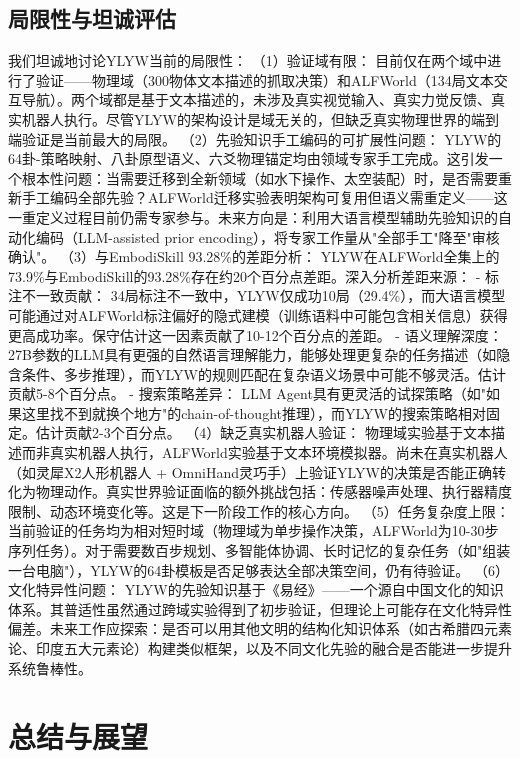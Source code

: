 \documentclass[12pt,a4paper]{article}
\begin{document}
\subsection{局限性与坦诚评估}
我们坦诚地讨论YLYW当前的局限性：
（1）验证域有限： 目前仅在两个域中进行了验证——物理域（300物体文本描述的抓取决策）和ALFWorld（134局文本交互导航）。两个域都是基于文本描述的，未涉及真实视觉输入、真实力觉反馈、真实机器人执行。尽管YLYW的架构设计是域无关的，但缺乏真实物理世界的端到端验证是当前最大的局限。
（2）先验知识手工编码的可扩展性问题： YLYW的64卦-策略映射、八卦原型语义、六爻物理锚定均由领域专家手工完成。这引发一个根本性问题：当需要迁移到全新领域（如水下操作、太空装配）时，是否需要重新手工编码全部先验？ALFWorld迁移实验表明架构可复用但语义需重定义——这一重定义过程目前仍需专家参与。未来方向是：利用大语言模型辅助先验知识的自动化编码（LLM-assisted prior encoding），将专家工作量从"全部手工"降至"审核确认"。
（3）与EmbodiSkill 93.28\%的差距分析： YLYW在ALFWorld全集上的73.9\%与EmbodiSkill的93.28\%存在约20个百分点差距。深入分析差距来源：
- 标注不一致贡献： 34局标注不一致中，YLYW仅成功10局（29.4\%），而大语言模型可能通过对ALFWorld标注偏好的隐式建模（训练语料中可能包含相关信息）获得更高成功率。保守估计这一因素贡献了10-12个百分点的差距。
- 语义理解深度： 27B参数的LLM具有更强的自然语言理解能力，能够处理更复杂的任务描述（如隐含条件、多步推理），而YLYW的规则匹配在复杂语义场景中可能不够灵活。估计贡献5-8个百分点。
- 搜索策略差异： LLM Agent具有更灵活的试探策略（如"如果这里找不到就换个地方"的chain-of-thought推理），而YLYW的搜索策略相对固定。估计贡献2-3个百分点。
（4）缺乏真实机器人验证： 物理域实验基于文本描述而非真实机器人执行，ALFWorld实验基于文本环境模拟器。尚未在真实机器人（如灵犀X2人形机器人 + OmniHand灵巧手）上验证YLYW的决策是否能正确转化为物理动作。真实世界验证面临的额外挑战包括：传感器噪声处理、执行器精度限制、动态环境变化等。这是下一阶段工作的核心方向。
（5）任务复杂度上限： 当前验证的任务均为相对短时域（物理域为单步操作决策，ALFWorld为10-30步序列任务）。对于需要数百步规划、多智能体协调、长时记忆的复杂任务（如"组装一台电脑"），YLYW的64卦模板是否足够表达全部决策空间，仍有待验证。
（6）文化特异性问题： YLYW的先验知识基于《易经》——一个源自中国文化的知识体系。其普适性虽然通过跨域实验得到了初步验证，但理论上可能存在文化特异性偏差。未来工作应探索：是否可以用其他文明的结构化知识体系（如古希腊四元素论、印度五大元素论）构建类似框架，以及不同文化先验的融合是否能进一步提升系统鲁棒性。

\section{总结与展望}
\end{document}
